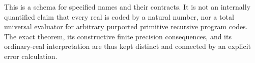 This is a schema for specified names and their contracts. It is not
an internally quantified claim that every real is coded by a natural
number, nor a total universal evaluator for arbitrary purported
primitive recursive program codes. The exact theorem, its
constructive finite precision consequences, and its ordinary-real
interpretation are thus kept distinct and connected by an explicit
error calculation.
